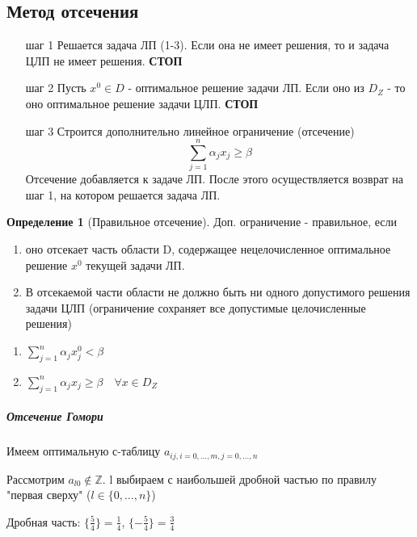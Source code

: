 \documentclass[a4paper]{article}
\theoremstyle{definition}
\newtheorem*{definition}{Определение}
\theoremstyle{remark}
\begin{document}
\subsection{Метод отсечения}
\begin{enumerate}
    \item [шаг 1] Решается задача ЛП (1-3). Если она не имеет решения, то и задача ЦЛП не имеет решения. \textbf{СТОП}
    \item [шаг 2] Пусть $x^0\in D$ - оптимальное решение задачи ЛП. Если оно из $D_Z$ - то оно оптимальное решение задачи ЦЛП. \textbf{СТОП}
    \item [шаг 3] Строится дополнительно линейное ограничение (отсечение)
    \[\sum_{j = 1}^n \alpha_j x_j \ge \beta\]
    Отсечение добавляется к задаче ЛП.
    После этого осуществляется возврат на шаг 1, на котором решается задача ЛП.
\end{enumerate}
\begin{definition}[Правильное отсечение]
    Доп. ограничение - правильное, если
    \begin{enumerate}
        \item оно отсекает часть области D, содержащее нецелочисленное оптимальное решение $x^0$ текущей задачи ЛП.
        \item В отсекаемой части области не должно быть ни одного допустимого решения задачи ЦЛП (ограничение сохраняет все допустимые целочисленные решения)
    \end{enumerate}
\end{definition}
\begin{enumerate}
    \item $\sum_{j = 1}^n \alpha_j x_j^0 < \beta$
    \item  $\sum_{j = 1}^n \alpha_j x_j \ge \beta \quad \forall x \in D_Z$
\end{enumerate}
\subparagraph*{Отсечение Гомори}
Имеем оптимальную с-таблицу $a_{ij, i = 0, \dots, m, j = 0, \dots, n}$

Рассмотрим $a_{l0}\notin \mathbb{Z}$. l выбираем с наибольшей дробной частью по правилу "первая сверху" ($l\in \{0, \dots, n\}$)

Дробная часть: $\{\frac54\} = \frac14$, $\{-\frac54\} = \frac34$
\end{document}
